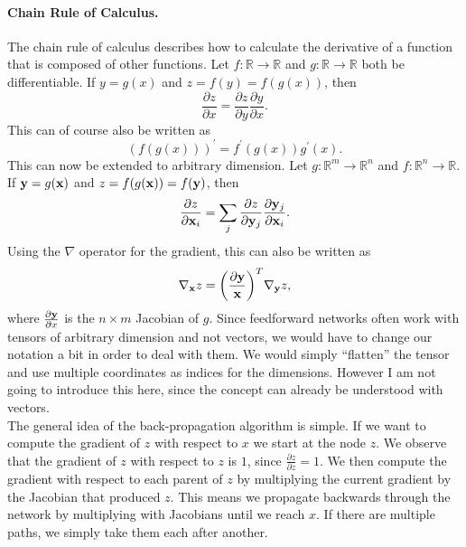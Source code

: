 \paragraph{Chain Rule of Calculus.}
The chain rule of calculus describes how to calculate the derivative of a function that is composed of other functions.
Let \(f: \mathbb{R} \rightarrow \mathbb{R}\) and \(g: \mathbb{R} \rightarrow \mathbb{R}\) both be differentiable.
If \(y = g(x)\) and \(z = f(y) = f(g(x))\), then
\begin{equation}
    \frac{\partial z}{\partial x} = \frac{\partial z}{\partial y} \frac{\partial y}{\partial x}.
\end{equation}
This can of course also be written as
\begin{equation}
    (f(g(x)))^\prime = f^\prime (g(x)) g^\prime(x).
\end{equation}
This can now be extended to arbitrary dimension.
Let \(g: \mathbb{R}^m \rightarrow \mathbb{R}^n\) and \(f: \mathbb{R}^n \rightarrow \mathbb{R}\).
If \(\mathbf{y} = g(\mathbf{x})\) and \(z = f(g(\mathbf{x})) = f(\mathbf{y})\), then
\begin{equation}
    \frac{\partial z}{\partial \mathbf{x}_{i}} = \sum_{j} \frac{\partial z}{\partial \mathbf{y}_{j}} \frac{\partial \mathbf{y}_{j}}{\partial \mathbf{x}_{i}}.
\end{equation}
Using the \(\nabla\) operator for the gradient, this can also be written as
\begin{equation}
    \label{eq:jacobian-vector-product}
    \nabla_{\mathbf{x}} z = \bigg( \frac{\partial \mathbf{y}}{\mathbf{x}} \bigg)^{T} \nabla_{\mathbf{y}} z,
\end{equation}
where \(\frac{\partial \mathbf{y}}{\partial x}\) is the \(n \times m\) Jacobian of \(g\).
Since feedforward networks often work with tensors of arbitrary dimension and not vectors, we would have to change our notation a bit in order to deal with them.
We would simply \enquote{flatten} the tensor and use multiple coordinates as indices for the dimensions.
However I am not going to introduce this here, since the concept can already be understood with vectors. \\

The general idea of the back-propagation algorithm is simple.
If we want to compute the gradient of \(z\) with respect to \(x\) we start at the node \(z\).
We observe that the gradient of \(z\) with respect to \(z\) is \(1\), since \(\frac{\partial z}{\partial z} = 1\).
We then compute the gradient with respect to each parent of \(z\) by multiplying the current gradient by the Jacobian that produced \(z\).
This means we propagate backwards through the network by multiplying with Jacobians until we reach \(x\).
If there are multiple paths, we simply take them each after another.

